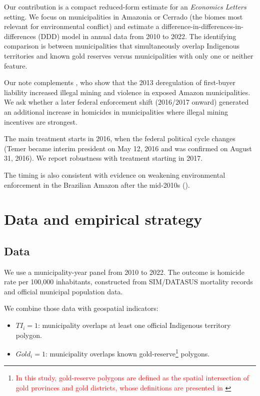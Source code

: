 \documentclass[preprint,12pt]{elsarticle}
\begin{document}
Our contribution is a compact reduced-form estimate for an \textit{Economics Letters} setting. We focus on municipalities in Amazonia or Cerrado (the biomes most relevant for environmental conflict) and estimate a difference-in-differences-in-differences (DDD) model in annual data from 2010 to 2022. The identifying comparison is between municipalities that simultaneously overlap Indigenous territories and known gold reserves versus municipalities with only one or neither feature.

Our note complements \citealp{pereira_pucci_2024}, who show that the 2013 deregulation of first-buyer liability increased illegal mining and violence in exposed Amazon municipalities. We ask whether a later federal enforcement shift (2016/2017 onward) generated an additional increase in homicides in municipalities where illegal mining incentives are strongest.

The main treatment starts in 2016, when the federal political cycle changes (Temer became interim president on May 12, 2016 and was confirmed on August 31, 2016). We report robustness with treatment starting in 2017.

The timing is also consistent with evidence on weakening environmental enforcement in the Brazilian Amazon after the mid-2010s (\citealp{braganca2022cutting,nunes2024lessons}).

\section{Data and empirical strategy}
\subsection{Data}
We use a municipality-year panel from 2010 to 2022. The outcome is homicide rate per 100,000 inhabitants, constructed from SIM/DATASUS mortality records and official municipal population data.

We combine those data with geospatial indicators:
\begin{itemize}
\item \(TI_i=1\): municipality overlaps at least one official Indigenous territory polygon.
\item \(Gold_i=1\): municipality overlaps known gold-reserve\footnote{\textcolor{red}{In this study, gold-reserve polygons are defined as the spatial intersection of gold provinces and gold districts, whose definitions are presented in \citealp{sgb2022}}} polygons.
\end{itemize}
\end{document}
